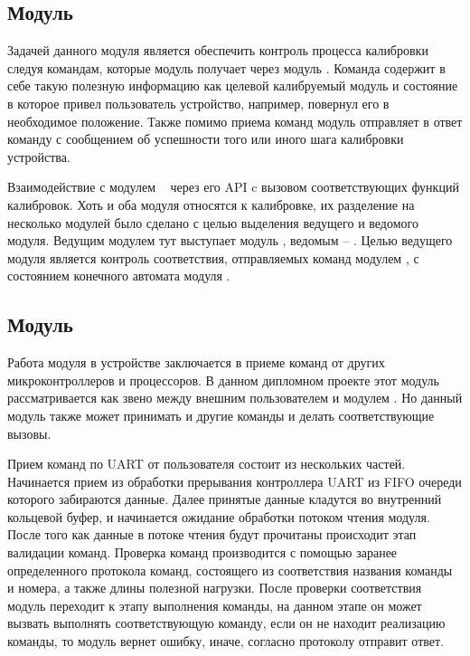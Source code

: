 

\subsection{Модуль \moduleCalibControl}

Задачей данного модуля является обеспечить контроль процесса калибровки следуя командам, которые модуль получает
через модуль \moduleUart. Команда содержит в себе такую полезную информацию как целевой калибруемый модуль и состояние 
в которое привел пользователь устройство, например, повернул его в необходимое положение. Также помимо приема команд 
модуль отправляет в ответ команду с сообщением об успешности того или иного шага калибровки устройства.

Взаимодействие с модулем \moduleCalib~ через его API c вызовом соответствующих функций калибровок. Хоть и оба модуля относятся к калибровке,
их разделение на несколько модулей было сделано с целью выделения ведущего и ведомого модуля. Ведущим модулем тут выступает модуль \moduleCalibControl, 
ведомым  -- \moduleCalib. Целью ведущего модуля является контроль соответствия, отправляемых команд модулем \moduleUart, с состоянием конечного 
автомата модуля \moduleCalib. 


\subsection{Модуль \moduleUart}

Работа модуля в устройстве заключается в приеме команд от других микроконтроллеров и процессоров. В данном дипломном проекте
этот модуль рассматривается как звено между внешним пользователем и модулем \moduleCalib. Но данный модуль также может принимать
и другие команды и делать соответствующие вызовы. 

Прием команд по UART от пользователя состоит из нескольких частей. Начинается прием из обработки прерывания контроллера UART из 
FIFO очереди которого забираются данные. Далее принятые данные кладутся во внутренний кольцевой буфер, и начинается ожидание обработки
потоком чтения модуля. После того как данные в потоке чтения будут прочитаны происходит этап валидации команд. 
Проверка команд производится с помощью заранее определенного протокола команд, состоящего из соответствия названия команды и номера, 
а также длины полезной нагрузки. После проверки соответствия модуль переходит к этапу выполнения команды, на данном этапе он может вызвать
выполнять соответствующую команду, если он не находит реализацию команды, то модуль вернет ошибку, иначе, согласно протоколу отправит ответ.

